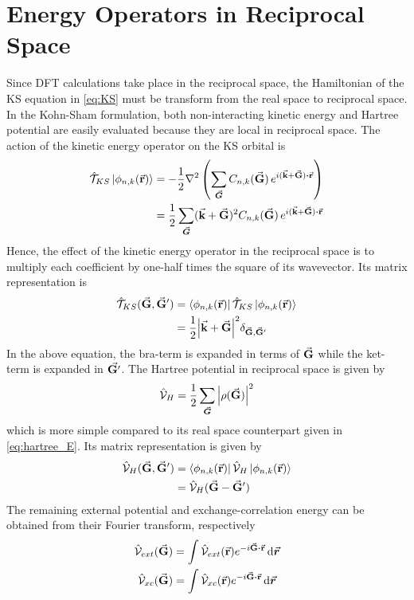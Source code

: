 \section{Energy Operators in Reciprocal Space}
Since DFT calculations take place in the reciprocal space, the Hamiltonian of  the KS equation in \eqref{eq:KS} must be transform from the real space to reciprocal space. In the Kohn-Sham formulation, both non-interacting kinetic energy and Hartree potential are easily evaluated because they are local in reciprocal space. The action of the  kinetic energy operator on the KS orbital  is
\begin{align}
    \hat{\mathcal{T}}_{KS} \ket{\phi_{n,k}(\va{r})} &= -\frac{1}{2} \laplacian \left( \sum_{\va*{G}} C_{n,k}(\va{G})\, e^{i (\va{k} + \va{G} ) \vdot \va{r}} \right) \\
    &= \frac{1}{2} \sum_{\va*{G}} (\va{k} + \va{G} )^2 C_{n,k}(\va{G})\, e^{i (\va{k} + \va{G} ) \vdot \va{r}}
\end{align}
Hence, the effect of the kinetic energy operator in the reciprocal space is to multiply each coefficient by one-half times the square of its wavevector. Its matrix representation is 
\begin{align}
    \hat{\mathcal{T}}_{KS}(\va{G},\va{G}')  &= \bra{\phi_{n,k}(\va{r})} \hat{\mathcal{T}}_{KS} \ket{\phi_{n,k}(\va{r})} \\
    &= \frac{1}{2} \abs{\va{k} + \va{G}}^2 \delta_{\va{G},\va{G}'}
\end{align}
In the above equation, the bra-term is expanded in terms  of $\va{G}$ while the ket-term is expanded in $\va{G'}$. The Hartree potential in reciprocal space is given by 
\begin{equation}
    \hat{\mathcal{V}}_H = \frac{1}{2} \sum_{\va*{G}} \abs{\rho({\va{G}})}^2
\end{equation}
which is more simple compared to its real space counterpart given in \eqref{eq:hartree_E}. Its matrix representation is given by 
\begin{align}
    \hat{\mathcal{V}}_H(\va{G},\va{G}')  &= \bra{\phi_{n,k}(\va{r})} \hat{\mathcal{V}}_H  \ket{\phi_{n,k}(\va{r})} \\
    &= \hat{\mathcal{V}}_H(\va{G} - \va{G}') \label{eq:hartree_rec}
\end{align}
The remaining external potential and exchange-correlation energy can be obtained from their  Fourier transform, respectively
\begin{align}
    \hat{\mathcal{V}}_{ext}(\va{G}) &= \int \hat{\mathcal{V}}_{ext}(\va{r}) e^{-i \va{G} \vdot \va{r}} \dd{\va*{r}} \\
    \hat{\mathcal{V}}_{xc}(\va{G}) &= \int \hat{\mathcal{V}}_{xc}(\va{r}) e^{-i \va{G} \vdot \va{r}} \dd{\va*{r}}
\end{align}
